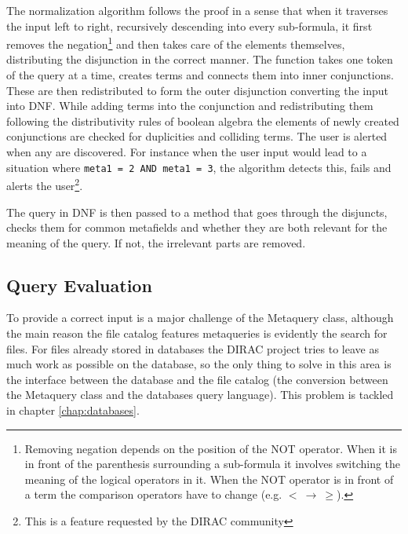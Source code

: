 The normalization algorithm follows the proof in a sense that when it traverses the input left to right, 
recursively descending into every sub-formula, it first removes the negation\footnote{Removing negation depends on 
the position of the NOT operator. When it is in front of the parenthesis surrounding a sub-formula it involves 
switching the meaning of the logical operators in it. When the NOT operator is in front of a term the comparison 
operators have to change (e.g. $ < \: \rightarrow \: \geq$).} 
and then takes care of the elements themselves, distributing the disjunction in the correct manner. %
The function takes one token of the query at a time, creates terms and connects them into inner conjunctions. 
These are then redistributed to form the outer disjunction converting the input into DNF. 
While adding terms into the conjunction and redistributing them following the distributivity rules of boolean algebra 
the elements of newly created conjunctions are checked for duplicities and colliding terms. The user is alerted 
when any are discovered. For instance when the user input would lead to a situation where 
\texttt{meta1 = 2 AND meta1 = 3}, the algorithm detects this, fails and alerts the 
user\footnote{This is a feature requested by the DIRAC community}. 


The query in DNF is then passed to a method that goes through the disjuncts, checks them for common metafields 
and whether they are both relevant for the meaning of the query. If not, the irrelevant parts are removed. %

\subsection{Query Evaluation}

To provide a correct input is a major challenge of the Metaquery class, although the main reason the file
catalog features metaqueries is evidently the search for files. For files already stored in databases the DIRAC
project tries to leave as much work as possible on the database, so the only thing to solve in this area is the 
interface between the database and the file catalog (the conversion between the Metaquery class and the databases
query language). This problem is tackled in chapter \ref{chap:databases}. 


